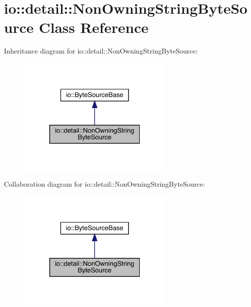 \hypertarget{classio_1_1detail_1_1_non_owning_string_byte_source}{}\section{io\+:\+:detail\+:\+:Non\+Owning\+String\+Byte\+Source Class Reference}
\label{classio_1_1detail_1_1_non_owning_string_byte_source}


Inheritance diagram for io\+:\+:detail\+:\+:Non\+Owning\+String\+Byte\+Source\+:\nopagebreak
\begin{figure}[H]
\begin{center}
\leavevmode
\includegraphics[width=217pt]{classio_1_1detail_1_1_non_owning_string_byte_source__inherit__graph}
\end{center}
\end{figure}


Collaboration diagram for io\+:\+:detail\+:\+:Non\+Owning\+String\+Byte\+Source\+:\nopagebreak
\begin{figure}[H]
\begin{center}
\leavevmode
\includegraphics[width=217pt]{classio_1_1detail_1_1_non_owning_string_byte_source__coll__graph}
\end{center}
\end{figure}
